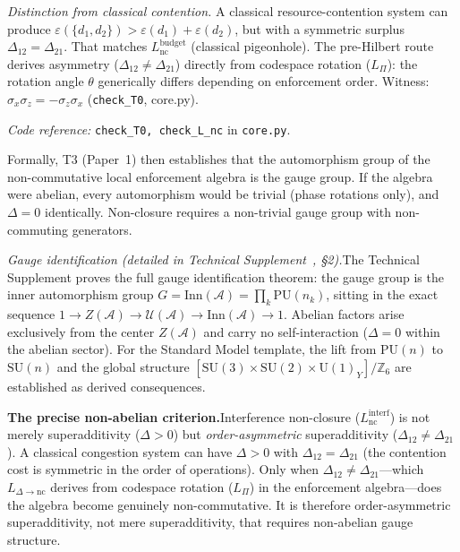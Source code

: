 \documentclass[11pt]{article}
\newcommand{\coderef}[2]{\smallskip\noindent\textit{Code reference:} \texttt{#1} in \texttt{#2}.}
\newcommand{\SU}{\mathrm{SU}}
\newcommand{\U}{\mathrm{U}}
\begin{document}
\begin{tcolorbox}[apfbox, title={Lemma $L_{\Delta\to\mathrm{nc}}$ (Interference Non-Closure Implies Non-Commutativity)}]
\smallskip\noindent\textit{Distinction from classical contention.}  A classical resource-contention system can produce $\varepsilon(\{d_1,d_2\}) > \varepsilon(d_1) + \varepsilon(d_2)$, but with a symmetric surplus $\Delta_{12} = \Delta_{21}$.  That matches $L_{\mathrm{nc}}^{\mathrm{budget}}$ (classical pigeonhole).  The pre-Hilbert route derives asymmetry ($\Delta_{12} \ne \Delta_{21}$) directly from codespace rotation ($L_\Pi$): the rotation angle $\theta$ generically differs depending on enforcement order.  Witness: $\sigma_x \sigma_z = -\sigma_z \sigma_x$ (\texttt{check\_T0}, core.py).

\coderef{check\_T0, check\_L\_nc}{core.py}
\end{tcolorbox}

Formally, T3 (Paper~1) then establishes that the automorphism group of the non-commutative local enforcement algebra is the gauge group.  If the algebra were abelian, every automorphism would be trivial (phase rotations only), and $\Delta = 0$ identically.  Non-closure requires a non-trivial gauge group with non-commuting generators.

\smallskip\noindent\textit{Gauge identification (detailed in Technical Supplement~\cite{BrookeP2Supplement}, \S2).}\quad The Technical Supplement proves the full gauge identification theorem: the gauge group is the inner automorphism group $G = \mathrm{Inn}(\mathcal{A}) = \prod_k \mathrm{PU}(n_k)$, sitting in the exact sequence $1 \to Z(\mathcal{A}) \to \mathcal{U}(\mathcal{A}) \to \mathrm{Inn}(\mathcal{A}) \to 1$.  Abelian factors arise exclusively from the center $Z(\mathcal{A})$ and carry no self-interaction ($\Delta = 0$ within the abelian sector).  For the Standard Model template, the lift from $\mathrm{PU}(n)$ to $\SU(n)$ and the global structure $[\SU(3) \times \SU(2) \times \U(1)_Y]/\mathbb{Z}_6$ are established as derived consequences.

\smallskip
\noindent\textbf{The precise non-abelian criterion.}\quad Interference non-closure ($L_{\mathrm{nc}}^{\mathrm{interf}}$) is not merely superadditivity ($\Delta > 0$) but \emph{order-asymmetric} superadditivity ($\Delta_{12} \ne \Delta_{21}$).  A classical congestion system can have $\Delta > 0$ with $\Delta_{12} = \Delta_{21}$ (the contention cost is symmetric in the order of operations).  Only when $\Delta_{12} \ne \Delta_{21}$---which $L_{\Delta\to\mathrm{nc}}$ derives from codespace rotation ($L_\Pi$) in the enforcement algebra---does the algebra become genuinely non-commutative.  It is therefore order-asymmetric superadditivity, not mere superadditivity, that requires non-abelian gauge structure.
\end{document}
